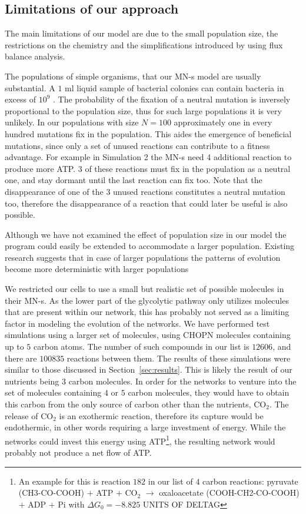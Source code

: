 \documentclass[a4paper,12pt]{article}
\begin{document}
\subsection{Limitations of our approach}
\label{sub:limitations}


The main limitations of our model are due to the small population size, the restrictions on the chemistry and the simplifications introduced by using flux balance analysis. 

The populations of simple organisms, that our MN-s model are usually substantial. A $1$ ml liquid sample of bacterial colonies can contain bacteria in excess of $10^9$ \cite{barteklecture}. The probability of the fixation of a neutral mutation is inversely proportional to the population size, thus for such large populations it is very unlikely. In our populations with size $N=100$ approximately one in every hundred mutations fix in the population. This aides the emergence of beneficial mutations, since only a set of unused reactions can contribute to a fitness advantage. For example in Simulation 2 the MN-s need 4 additional reaction to produce more ATP. $3$ of these reactions must fix in the population as a neutral one, and stay dormant until the last reaction can fix too. Note that the disappearance of one of the $3$ unused reactions constitutes a neutral mutation too, therefore the disappearance of a reaction that could later be useful is also possible.

Although we have not examined the effect of population size in our model the program could easily be extended to accommodate a larger population. Existing research suggests that in case of larger populations the patterns of evolution become more deterministic with larger populations \cite{predictability}


We restricted our cells to use a small but realistic set of possible molecules in their MN-s. As the lower part of the glycolytic pathway only utilizes molecules that are present within our network, this has probably not served as a limiting factor in modeling the evolution of the networks. We have performed test simulations using a larger set of molecules, using CHOPN molecules containing up to $5$ carbon atoms. The number of such compounds in our list is $12606$, and there are $100 835$ reactions between them. The results of these simulations were similar to those discussed in Section~\ref{sec:results}. This is likely the result of our nutrients being $3$ carbon molecules. In order for the networks to venture into the set of molecules containing $4$ or $5$ carbon molecules, they would have to obtain this carbon from the only source of carbon other than the nutrients,  CO$_2$. The release of CO$_2$ is an exothermic reaction, therefore its capture would be endothermic, in other words requiring a large investment of energy. While the networks could invest this energy using ATP\footnote{ An example for this is reaction $182$ in our list of $4$ carbon reactions: pyruvate (CH3-CO-COOH) $+$ ATP $+$ CO$_2$ $\rightarrow$   oxaloacetate (COOH-CH2-CO-COOH) $+$ ADP $+$ Pi with $\Delta G_0=-8.825$ UNITS OF DELTAG}, the resulting network would probably not produce a net flow of ATP. 
\end{document}
